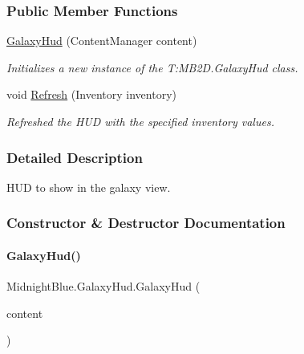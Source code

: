 \subsubsection*{Public Member Functions}
\begin{DoxyCompactItemize}
\item 
\hyperlink{class_midnight_blue_1_1_galaxy_hud_a6f15257e5bc5bbc67cac3888f075ea29}{Galaxy\+Hud} (Content\+Manager content)
\begin{DoxyCompactList}\small\item\em Initializes a new instance of the T\+:\+M\+B2\+D.\+Galaxy\+Hud class. \end{DoxyCompactList}\item 
void \hyperlink{class_midnight_blue_1_1_galaxy_hud_aea2d04b212188a2e729ea327b7da0449}{Refresh} (Inventory inventory)
\begin{DoxyCompactList}\small\item\em Refreshed the H\+UD with the specified inventory values. \end{DoxyCompactList}\end{DoxyCompactItemize}


\subsubsection{Detailed Description}
H\+UD to show in the galaxy view. 



\subsubsection{Constructor \& Destructor Documentation}
\hypertarget{class_midnight_blue_1_1_galaxy_hud_a6f15257e5bc5bbc67cac3888f075ea29}{}\label{class_midnight_blue_1_1_galaxy_hud_a6f15257e5bc5bbc67cac3888f075ea29} 
\paragraph{\texorpdfstring{Galaxy\+Hud()}{GalaxyHud()}}
{\footnotesize\ttfamily Midnight\+Blue.\+Galaxy\+Hud.\+Galaxy\+Hud (\begin{DoxyParamCaption}\item[{Content\+Manager}]{content }\end{DoxyParamCaption})\hspace{0.3cm}{\ttfamily [inline]}}



